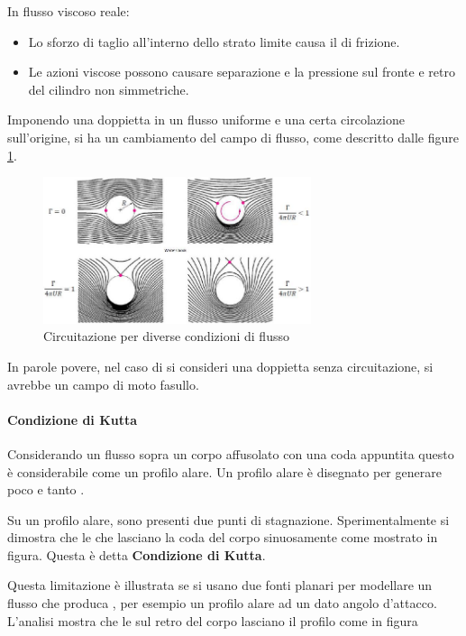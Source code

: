 In flusso viscoso reale:
\begin{itemize}
\item Lo sforzo di taglio all'interno dello strato limite causa il  di frizione.
\item Le azioni viscose possono causare separazione e la pressione sul fronte e retro del cilindro non simmetriche. 
\end{itemize}

Imponendo una doppietta in un flusso uniforme e una certa circolazione sull'origine, si ha un cambiamento del campo di flusso, come descritto dalle figure \ref{fig:FlowFieldChange}.

\begin{figure}\centering
\includegraphics[width = 0.7\textwidth]{gfx/FlowFieldChange}
\caption{Circuitazione per diverse condizioni di flusso}
\label{fig:FlowFieldChange}
\end{figure}

In parole povere, nel caso di si consideri una doppietta senza circuitazione, si avrebbe un campo di moto fasullo.

\paragraph{Condizione di Kutta}
Considerando un flusso sopra un corpo affusolato con una coda appuntita questo è considerabile come un profilo alare.
Un profilo alare è disegnato per generare poco  e tanto .

Su un profilo alare, sono presenti due punti di stagnazione.
Sperimentalmente si dimostra che le  che lasciano la coda del corpo sinuosamente come mostrato in figura.
Questa è detta \textbf{Condizione di Kutta}.

Questa limitazione è illustrata se si usano due fonti planari per modellare un flusso che produca , per esempio un profilo alare ad un dato angolo d'attacco.
L'analisi mostra che le  sul retro del corpo lasciano il profilo come in figura 

